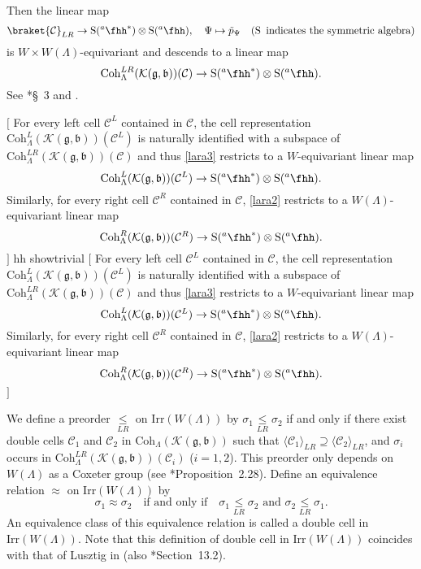 \documentclass[12pt]{amsart}
\makeatletter
\newcommand{\trivial}[2][]{\if\relax\detokenize{#1}\relax
  {%
      \color{orange} \vspace{0em}$[$#2$]$
      \color{black}
  }
  \else
\ifx#1h
\ifcsname showtrivial\endcsname
{%
    \color{orange}\vspace{0em}$[$#2$]$
    \color{black}
}
\fi
\else {\red Wrong argument!} \fi
\fi
}
\def\inn#1#2{\left\langle
      \def\ta{#1}\def\tb{#2}
      \ifx\ta\@empty{\;} \else {\ta}\fi ,
      \ifx\tb\@empty{\;} \else {\tb}\fi
      \right\rangle}
\newcommand{\CC}{{\mathcal {C}}}
\newcommand{\CK}{{\mathcal {K}}}
\newcommand{\oS}{\operatorname{S}}
\newcommand{\g}{\mathfrak g}
\renewcommand{\b}{\mathfrak b}
\newcommand{\la}{\langle}
\newcommand{\ra}{\rangle}
\numberwithin{equation}{section}
\theoremstyle{remark}
\def\Irr{\mathrm{Irr}}
\def\hha{{}^a\fhh}
\def\ahh{\hha}
\def\Coh{\mathrm{Coh}}
\def\leqLR{\mathrel{\mathop{\leq}\limits_{\scriptscriptstyle LR}}}
\def\approxLR{\mathrel{\mathop{\approx}\limits^{\scalebox{0.4}{$LR$}}}}
\def\approxLR{\approx}
\makeatother
\begin{document}

Then the linear map
\begin{equation}\label{lara}
    \braket{\CC}_{LR}\rightarrow \oS(\hha^*)\otimes \oS(\hha), \quad \Psi\mapsto \tilde p_{\Psi}\quad (\oS\textrm{ indicates the symmetric algebra})
\end{equation}
is $W\times W(\Lambda)$-equivariant  %
and descends to a linear map
\begin{equation}\label{lara2}
 \Coh^{LR}_{\Lambda}( \CK(\g,\b))( \CC) \rightarrow \oS(\hha^*)\otimes \oS(\hha).
\end{equation}
See  \cite{J2}*{\S~3} and \cite[Corollary 2.15]{BV2}.


\trivial[h]{
For every left cell $\CC^L$ contained in $\CC$,
the cell representation  $\Coh^{L}_{\Lambda}( \CK(\g,\b))( \CC^L)$
is naturally identified with a subspace of $\Coh^{LR}_{\Lambda}( \CK(\g,\b))( \CC)$
and thus \eqref{lara3} restricts to a  $W$-equivariant linear map
\begin{equation}\label{lara3}
    \Coh^{L}_{\Lambda}( \CK(\g,\b))( \CC^L) \rightarrow \oS(\hha^*)\otimes \oS(\hha).%
\end{equation}
Similarly, for every right cell $\CC^R$ contained in $\CC$, \eqref{lara2} restricts to a  $W(\Lambda)$-equivariant linear map
\begin{equation}\label{lara4}
    \Coh^{R}_{\Lambda}( \CK(\g,\b))( \CC^R) \rightarrow \oS(\hha^*)\otimes \oS(\hha).%
\end{equation}
}

We define a preorder $\leqLR$ on $\Irr(W(\Lambda))$ by
$
  \sigma_1\leqLR \sigma_2$ if and only if there exist double cells $\CC_1$ and $\CC_2$ in $\Coh_{\Lambda}(\CK( \g, \b))$ such that $\la \CC_1\ra_{LR}\supseteq \la \CC_2\ra_{LR}$, and $\sigma_i$ occurs in  $\Coh^{LR}_{ \Lambda}(\CK( \g, \b))(\CC_i)$ ($i=1,2$).
This preorder only depends on $W(\Lambda)$ as a Coxeter group (see \cite{BV2}*{Proposition~2.28}). Define an equivalence relation $\approxLR$ on
$\Irr(W(\Lambda))$ by
\[
  \sigma_1\approxLR \sigma_2\quad \textrm{if and only if}\quad
  \sigma_1\leqLR \sigma_2\textrm{ and } \sigma_2\leqLR \sigma_1.
\]
An equivalence class of this equivalence relation  is called a double cell in
$\Irr(W(\Lambda))$. Note that this definition of double cell in $\Irr(W(\Lambda))$ coincides with that of Lusztig in \cite{Lcell} (also \cite{Carter}*{Section~13.2}).
\end{document}
